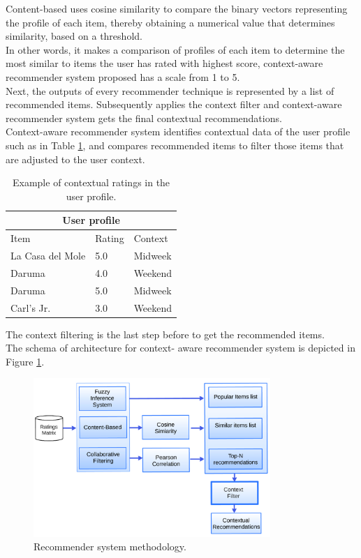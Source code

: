 Content-based uses cosine similarity to compare the binary
vectors representing the profile of each item, thereby obtaining a
numerical value that determines similarity, based on a threshold. \\   
In other words, it makes a comparison of profiles of each item to
determine the most similar to items the user has rated with highest
score, context-aware recommender system proposed has a scale 
from 1 to 5. \\
Next, the outputs of every recommender technique is represented by a
list of recommended items. Subsequently applies the context filter and
context-aware recommender system gets the final contextual
recommendations.\\  Context-aware recommender system identifies
contextual data of the user profile such as in Table  \ref{tab:2}, and
compares recommended items to filter those items that are adjusted to
the user context.  
\begin{table}[htb]
\small
\centering
\captionsetup{font=footnotesize}
\caption{Example of contextual ratings in the user profile.}
\label{tab:2}
\small
\begin{tabular}{lll}
\hline
\multicolumn{3}{c}{\textbf{User profile}} \\ \hline
Item & Rating & Context \\ \hline
La Casa del Mole & 5.0 & Midweek \\ 
Daruma           & 4.0 & Weekend \\ 
Daruma           & 5.0 & Midweek \\ 
Carl's Jr.       & 3.0 & Weekend \\ \hline
\end{tabular}
\end{table}
The context filtering is the last step before to
get the recommended items. \\The schema of architecture for context-
aware recommender system is depicted in Figure  \ref{fig:architecture}.
\begin{figure}
\captionsetup{font=footnotesize}
\centering
\includegraphics[width=0.80\textwidth]{img/archit-ta.png}
\caption{Recommender system methodology.}
\label{fig:architecture}   
\end{figure}
